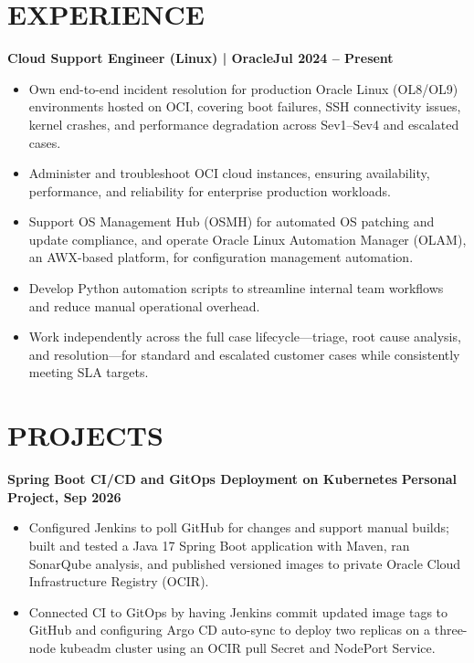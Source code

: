 \documentclass[a4paper,10pt]{extarticle}
\begin{document}
\section*{EXPERIENCE}
\textbf{Cloud Support Engineer (Linux) | Oracle}\hfill\textbf{Jul 2024 -- Present}\par
\begin{itemize}
  \item Own end-to-end incident resolution for production Oracle Linux (OL8/OL9)
  environments hosted on OCI, covering boot failures, SSH connectivity issues,
  kernel crashes, and performance degradation across Sev1--Sev4 and escalated cases.
  \item Administer and troubleshoot OCI cloud instances, ensuring availability,
  performance, and reliability for enterprise production workloads.
  \item Support OS Management Hub (OSMH) for automated OS patching and update
  compliance, and operate Oracle Linux Automation Manager (OLAM), an AWX-based
  platform, for configuration management automation.
  \item Develop Python automation scripts to streamline internal team workflows
  and reduce manual operational overhead.
  \item Work independently across the full case lifecycle---triage, root cause
  analysis, and resolution---for standard and escalated customer cases while
  consistently meeting SLA targets.
\end{itemize}

\section*{PROJECTS}
\textbf{Spring Boot CI/CD and GitOps Deployment on Kubernetes}
\hfill\textbf{Personal Project, Sep 2026}\par
\begin{itemize}
  \item Configured Jenkins to poll GitHub for changes and support manual builds;
  built and tested a Java 17 Spring Boot application with Maven, ran SonarQube
  analysis, and published versioned images to private Oracle Cloud Infrastructure
  Registry (OCIR).
  \item Connected CI to GitOps by having Jenkins commit updated image tags to
  GitHub and configuring Argo CD auto-sync to deploy two replicas on a three-node
  kubeadm cluster using an OCIR pull Secret and NodePort Service.
\end{itemize}
\end{document}
